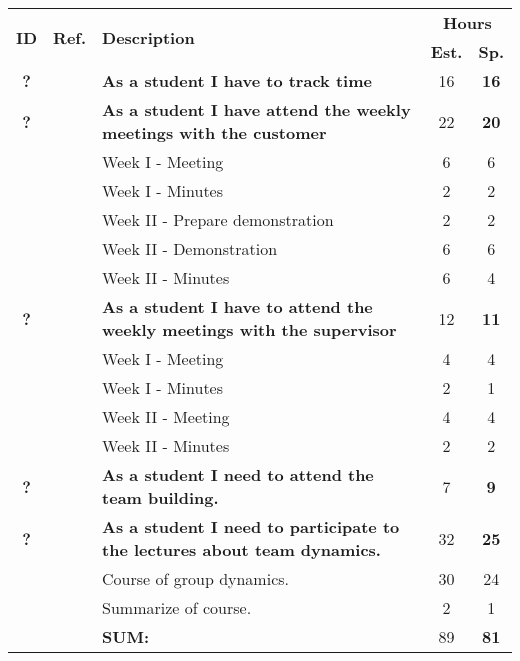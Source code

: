 \label{tab:sprint1storiesProcess}
\def\arraystretch{1.25}
 
\begin{longtable}{ccXcc}

\toprule[0.5mm]
\multirow{2}{*}{\textbf{ID}} &
\multirow{2}{*}{\textbf{Ref.}} & \multirow{2}{*}{\textbf{Description}} & \multicolumn{2}{c}{\textbf{Hours}} \\
 					& & & \textbf{Est.} & \textbf{Sp.} \\
\midrule

\textbf{?} 	&& {\bf  As a student I have to track time} 										& 	16	& \textbf{16} \\
	
\textbf{?} 	&& {\bf As a student I have attend the weekly meetings with the customer} 			& 	22	& \textbf{20} \\
		&& Week I - Meeting							&  6 & 6 \\
		&& Week I - Minutes							&  2 & 2 \\
		&& Week II - Prepare demonstration			&  2 & 2 \\ 
		&& Week II - Demonstration					&  6 & 6 \\
		&& Week II - Minutes						&  6 & 4 \\


		
\textbf{?} 	&& {\bf As a student I have to attend the weekly meetings with the supervisor} 		& 	12	& \textbf{11} \\
		&& Week I - Meeting							&  4 & 4 \\
		&& Week I - Minutes							&  2 & 1 \\
		&& Week II - Meeting						&  4 & 4 \\
		&& Week II - Minutes						&  2 & 2 \\


\textbf{?} 	&& {\bf As a student I need to attend the team building.} 							& 		7	& \textbf{9} \\
		

\textbf{?} 	&& {\bf As a student I need to participate to the lectures about team dynamics. } 	& 		32	& \textbf{25} \\
		&& Course of group dynamics.				& 30  & 24 \\
		&& Summarize of course.						& 2  & 1 \\				
				
\hline
				&& \textbf{SUM:}		&		89	& \textbf{81}
 \\																			
\bottomrule[0.5mm]
\end{longtable}
